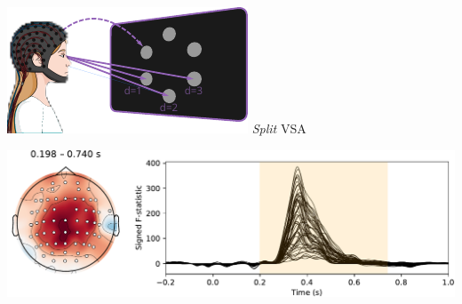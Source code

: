 \documentclass{kul-ulille-beamer}
\begin{document}
\begin{frame}
\begin{minipage}[t]{.45\textwidth}
    \includegraphics[width=.2\textwidth]{figures/covert/attention_split.pdf}
    \hspace{.5em}
    \emph{Split} VSA
    \smallskip


    \includegraphics[width=\textwidth]{figures/covert/erps/erp_split_cluster-0.pdf}

  \end{minipage}

\end{frame}

\end{document}
